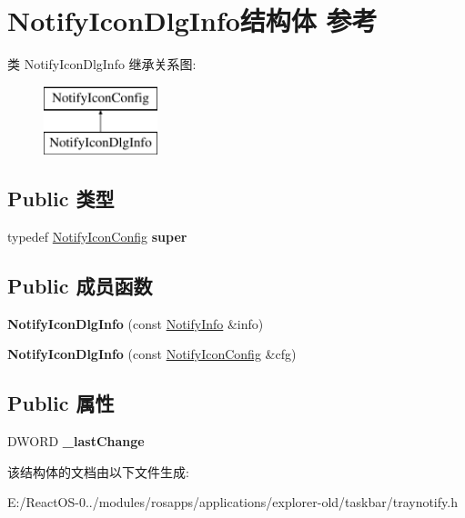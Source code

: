 \hypertarget{struct_notify_icon_dlg_info}{}\section{Notify\+Icon\+Dlg\+Info结构体 参考}
\label{struct_notify_icon_dlg_info}
类 Notify\+Icon\+Dlg\+Info 继承关系图\+:\begin{figure}[H]
\begin{center}
\leavevmode
\includegraphics[height=2.000000cm]{struct_notify_icon_dlg_info}
\end{center}
\end{figure}
\subsection*{Public 类型}
\begin{DoxyCompactItemize}
\item 
\mbox{\label{struct_notify_icon_dlg_info_a3ee6c781def5c042638131bb8a00523d}} 
typedef \hyperlink{struct_notify_icon_config}{Notify\+Icon\+Config} {\bfseries super}
\end{DoxyCompactItemize}
\subsection*{Public 成员函数}
\begin{DoxyCompactItemize}
\item 
\mbox{\label{struct_notify_icon_dlg_info_a85766415c57ed827bb1529e534f87dee}} 
{\bfseries Notify\+Icon\+Dlg\+Info} (const \hyperlink{struct_notify_info}{Notify\+Info} \&info)
\item 
\mbox{\label{struct_notify_icon_dlg_info_a68df2bd94891fd9d99e593da3cddcadf}} 
{\bfseries Notify\+Icon\+Dlg\+Info} (const \hyperlink{struct_notify_icon_config}{Notify\+Icon\+Config} \&cfg)
\end{DoxyCompactItemize}
\subsection*{Public 属性}
\begin{DoxyCompactItemize}
\item 
\mbox{\label{struct_notify_icon_dlg_info_a1876cea7a4a1a1918b75486881bde37c}} 
D\+W\+O\+RD {\bfseries \+\_\+last\+Change}
\end{DoxyCompactItemize}


该结构体的文档由以下文件生成\+:\begin{DoxyCompactItemize}
\item 
E\+:/\+React\+O\+S-\/0../modules/rosapps/applications/explorer-\/old/taskbar/traynotify.\+h\end{DoxyCompactItemize}
